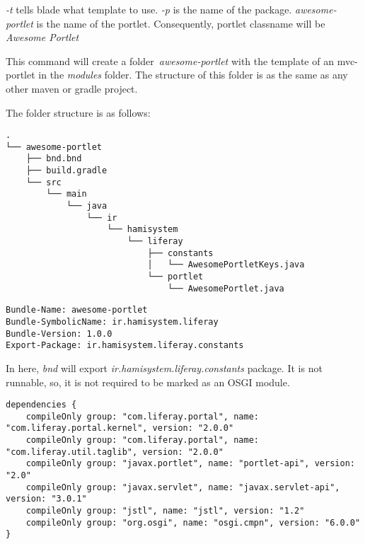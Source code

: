 \textit{-t} tells blade what template to use.
\textit{-p} is the name of the package.
\textit{awesome-portlet} is the name of the portlet. Consequently, portlet classname will be \textit{Awesome Portlet}

This command will create a folder \textit{awesome-portlet} with the template of an mvc-portlet in the \textit{modules} folder. The structure of this folder is as the same as any other maven or gradle project.

The folder structure is as follows:

\lstset{language=bash}
\begin{minipage}{\linewidth}
\begin{lstlisting}[caption=Folder Structure]
.
└── awesome-portlet
    ├── bnd.bnd
    ├── build.gradle
    └── src
        └── main
            └── java
                └── ir
                    └── hamisystem
                        └── liferay
                            ├── constants
                            │   └── AwesomePortletKeys.java
                            └── portlet
                                └── AwesomePortlet.java
\end{lstlisting}
\end{minipage}

\lstset{language=bnd}
\begin{minipage}{\linewidth}
\begin{lstlisting}[caption=bnd.bnd]
Bundle-Name: awesome-portlet
Bundle-SymbolicName: ir.hamisystem.liferay
Bundle-Version: 1.0.0
Export-Package: ir.hamisystem.liferay.constants
\end{lstlisting}
\end{minipage}

In here, \textit{bnd} will export \textit{ir.hamisystem.liferay.constants} package. It is not runnable, so, it is not required to be marked as an OSGI module.

\lstset{language=groovy}
\begin{minipage}{\linewidth}
\begin{lstlisting}[caption=build.gradle]
dependencies {
	compileOnly group: "com.liferay.portal", name: "com.liferay.portal.kernel", version: "2.0.0"
	compileOnly group: "com.liferay.portal", name: "com.liferay.util.taglib", version: "2.0.0"
	compileOnly group: "javax.portlet", name: "portlet-api", version: "2.0"
	compileOnly group: "javax.servlet", name: "javax.servlet-api", version: "3.0.1"
	compileOnly group: "jstl", name: "jstl", version: "1.2"
	compileOnly group: "org.osgi", name: "osgi.cmpn", version: "6.0.0"
}
\end{lstlisting}
\end{minipage}


